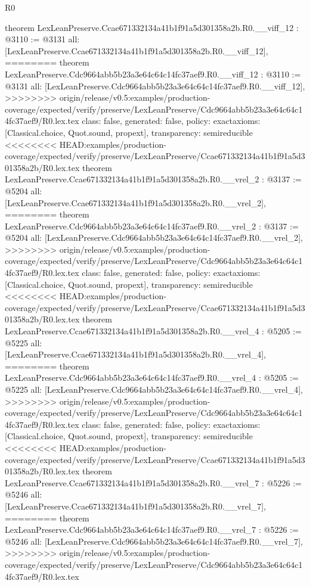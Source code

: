\begin{lexlean}{R0}
\begin{coremodule}
{{{{{{{{{{{{{{{{{{{{{{{{{{{{{{{{{{{{{{{{{{{{{{{{{{{{{{{{{{{{{{{{{{theorem LexLeanPreserve.Ccae671332134a41b1f91a5d301358a2b.R0.__viff_12 : @3110 := @3131 {
  all: [LexLeanPreserve.Ccae671332134a41b1f91a5d301358a2b.R0.__viff_12],
========
theorem LexLeanPreserve.Cdc9664abb5b23a3e64c64c14fc37aef9.R0.__viff_12 : @3110 := @3131 {
  all: [LexLeanPreserve.Cdc9664abb5b23a3e64c64c14fc37aef9.R0.__viff_12],
>>>>>>>> origin/release/v0.5:examples/production-coverage/expected/verify/preserve/LexLeanPreserve/Cdc9664abb5b23a3e64c64c14fc37aef9/R0.lex.tex
  class: false,
  generated: false,
  policy: exact{axioms: [Classical.choice, Quot.sound, propext]},
  transparency: semireducible
}
<<<<<<<< HEAD:examples/production-coverage/expected/verify/preserve/LexLeanPreserve/Ccae671332134a41b1f91a5d301358a2b/R0.lex.tex
theorem LexLeanPreserve.Ccae671332134a41b1f91a5d301358a2b.R0.__vrel_2 : @3137 := @5204 {
  all: [LexLeanPreserve.Ccae671332134a41b1f91a5d301358a2b.R0.__vrel_2],
========
theorem LexLeanPreserve.Cdc9664abb5b23a3e64c64c14fc37aef9.R0.__vrel_2 : @3137 := @5204 {
  all: [LexLeanPreserve.Cdc9664abb5b23a3e64c64c14fc37aef9.R0.__vrel_2],
>>>>>>>> origin/release/v0.5:examples/production-coverage/expected/verify/preserve/LexLeanPreserve/Cdc9664abb5b23a3e64c64c14fc37aef9/R0.lex.tex
  class: false,
  generated: false,
  policy: exact{axioms: [Classical.choice, Quot.sound, propext]},
  transparency: semireducible
}
<<<<<<<< HEAD:examples/production-coverage/expected/verify/preserve/LexLeanPreserve/Ccae671332134a41b1f91a5d301358a2b/R0.lex.tex
theorem LexLeanPreserve.Ccae671332134a41b1f91a5d301358a2b.R0.__vrel_4 : @5205 := @5225 {
  all: [LexLeanPreserve.Ccae671332134a41b1f91a5d301358a2b.R0.__vrel_4],
========
theorem LexLeanPreserve.Cdc9664abb5b23a3e64c64c14fc37aef9.R0.__vrel_4 : @5205 := @5225 {
  all: [LexLeanPreserve.Cdc9664abb5b23a3e64c64c14fc37aef9.R0.__vrel_4],
>>>>>>>> origin/release/v0.5:examples/production-coverage/expected/verify/preserve/LexLeanPreserve/Cdc9664abb5b23a3e64c64c14fc37aef9/R0.lex.tex
  class: false,
  generated: false,
  policy: exact{axioms: [Classical.choice, Quot.sound, propext]},
  transparency: semireducible
}
<<<<<<<< HEAD:examples/production-coverage/expected/verify/preserve/LexLeanPreserve/Ccae671332134a41b1f91a5d301358a2b/R0.lex.tex
theorem LexLeanPreserve.Ccae671332134a41b1f91a5d301358a2b.R0.__vrel_7 : @5226 := @5246 {
  all: [LexLeanPreserve.Ccae671332134a41b1f91a5d301358a2b.R0.__vrel_7],
========
theorem LexLeanPreserve.Cdc9664abb5b23a3e64c64c14fc37aef9.R0.__vrel_7 : @5226 := @5246 {
  all: [LexLeanPreserve.Cdc9664abb5b23a3e64c64c14fc37aef9.R0.__vrel_7],
>>>>>>>> origin/release/v0.5:examples/production-coverage/expected/verify/preserve/LexLeanPreserve/Cdc9664abb5b23a3e64c64c14fc37aef9/R0.lex.tex
}}}}}}}}}}}}}}}}}}}}}}}}}}}}}}}}}}}}}}}}}}}}}}}}}}}}}}}}}}}}}}}}}}}}}}}
\end{coremodule}
\end{lexlean}

